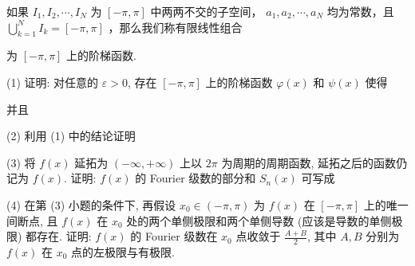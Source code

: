 \par{}
如果  $I_{1}, I_{2}, \cdots, I_{N}$  为  $[-\pi, \pi]$  中两两不交的子空间， $a_{1}, a_{2}, \cdots, a_{N}$  均为常数，且  $\bigcup_{k=1}^{N} I_{k} = [-\pi, \pi]$ ，那么我们称有限线性组合\par
\nopagebreak[4]
为 $[- \pi, \pi]$ 上的阶梯函数.\par
\par{}
(1) 证明: 对任意的 $\varepsilon > 0$, 存在 $[- \pi, \pi]$ 上的阶梯函数 $\varphi(x)$ 和 $\psi(x)$ 使得\par
\nopagebreak[4]
\par{}
并且\par
\nopagebreak[4]
\par{}
(2) 利用 (1) 中的结论证明\par
\nopagebreak[4]
\par{}
(3) 将 $f(x)$ 延拓为 $(- \infty, + \infty)$ 上以 $2\pi$ 为周期的周期函数, 延拓之后的函数仍记为 $f(x)$. 证明: $f(x)$ 的 Fourier 级数的部分和 $S_{n}(x)$ 可写成\par
\nopagebreak[4]
(4) 在第 (3) 小题的条件下, 再假设 $x_0 \in (-\pi, \pi)$ 为 $f(x)$ 在 $[- \pi, \pi]$ 上的唯一间断点, 且 $f(x)$ 在 $x_0$ 处的两个单侧极限和两个单侧导数 (应该是导数的单侧极限) 都存在. 证明: $f(x)$ 的 Fourier 级数在 $x_0$ 点收敛于 $\frac{A + B}{2}$, 其中 $A, B$ 分别为 $f(x)$ 在 $x_0$ 点的左极限与有极限.\par
